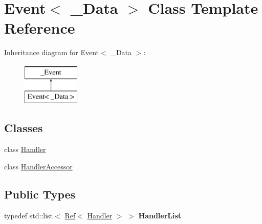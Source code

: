 \hypertarget{class_event}{
\section{Event$<$ \_\-Data $>$ Class Template Reference}
\label{class_event}
}
Inheritance diagram for Event$<$ \_\-Data $>$:\begin{figure}[H]
\begin{center}
\leavevmode
\includegraphics[height=2cm]{class_event}
\end{center}
\end{figure}
\subsection*{Classes}
\begin{DoxyCompactItemize}
\item 
class \hyperlink{class_event_1_1_handler}{Handler}
\item 
class \hyperlink{class_event_1_1_handler_accessor}{HandlerAccessor}
\end{DoxyCompactItemize}
\subsection*{Public Types}
\begin{DoxyCompactItemize}
\item 
\hypertarget{class_event_aba9bdd3be90bde920610ff33b45395a8}{
typedef std::list$<$ \hyperlink{class_ref}{Ref}$<$ \hyperlink{class_event_1_1_handler}{Handler} $>$ $>$ {\bfseries HandlerList}}
\label{class_event_aba9bdd3be90bde920610ff33b45395a8}

\end{DoxyCompactItemize}
